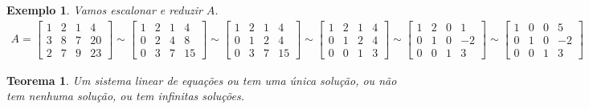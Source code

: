 \documentclass{article}
\newtheorem{theorem}{Teorema}[section]
\newtheorem*{example}{Exemplo}
\begin{document}
\begin{example}
	Vamos escalonar e reduzir $A$.
	\begin{align*}
	A = \begin{bmatrix}
	1 & 2 & 1 & 4 \\
	3 & 8 & 7 & 20 \\
	2 & 7 & 9 & 23
	\end{bmatrix}
	\sim
	\begin{bmatrix}
	1 & 2 & 1 & 4 \\
	0 & 2 & 4 & 8 \\
	0 & 3 & 7 & 15
	\end{bmatrix}
	\sim
	\begin{bmatrix}
	1 & 2 & 1 & 4 \\
	0 & 1 & 2 & 4 \\
	0 & 3 & 7 & 15
	\end{bmatrix}
	\sim
	\begin{bmatrix}
	1 & 2 & 1 & 4 \\
	0 & 1 & 2 & 4 \\
	0 & 0 & 1 & 3
	\end{bmatrix}
	\sim
	\begin{bmatrix}
	1 & 2 & 0 & 1 \\
	0 & 1 & 0 & -2 \\
	0 & 0 & 1 & 3
	\end{bmatrix}
	\sim
	\begin{bmatrix}
	1 & 0 & 0 & 5 \\
	0 & 1 & 0 & -2 \\
	0 & 0 & 1 & 3
	\end{bmatrix}
	\end{align*}
\end{example}

\begin{theorem}
	Um sistema linear de equações ou tem uma única solução, ou não tem nenhuma solução, ou tem infinitas soluções.
\end{theorem}
\end{document}
